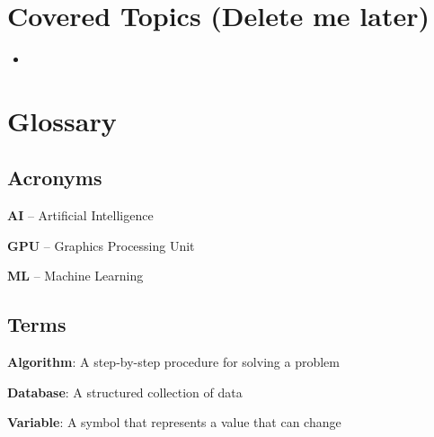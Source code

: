 \documentclass[12pt]{article}
\newcommand{\term}[2]{\textbf{#1}: #2}
\newcommand{\acronym}[2]{\textbf{#1} -- #2}
\begin{document}
\section{Covered Topics (Delete me later)}
\begin{itemize}
    \item 
\end{itemize}
\newpage

\newpage
{}
\section{Glossary}
\subsection{Acronyms}
\acronym{AI}{Artificial Intelligence}

\acronym{GPU}{Graphics Processing Unit}

\acronym{ML}{Machine Learning}

\subsection{Terms}
\term{Algorithm}{A step-by-step procedure for solving a problem}

\term{Database}{A structured collection of data}

\term{Variable}{A symbol that represents a value that can change}
\end{document}
